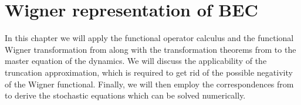 \chapter{Wigner representation of BEC}
\label{cha:wigner-bec}

In this chapter we will apply the functional operator calculus and the functional Wigner transformation from  along with the transformation theorems from  to the master equation of the  dynamics.
We will discuss the applicability of the truncation approximation, which is required to get rid of the possible negativity of the Wigner functional.
Finally, we will then employ the correspondences from  to derive the stochastic equations which can be solved numerically.









